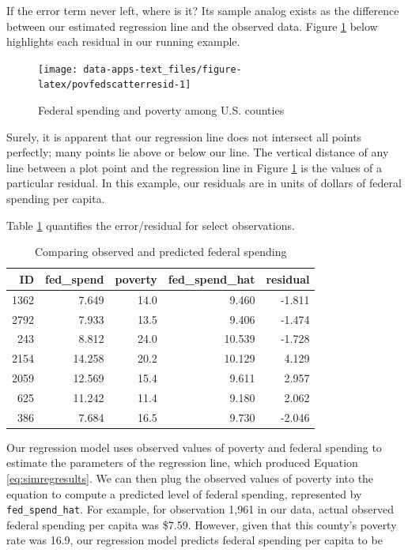 \documentclass[
]{book}
\begin{document}
If the error term never left, where is it? Its sample analog exists as the difference between our estimated regression line and the observed data. Figure \ref{fig:povfedscatterresid} below highlights each residual in our running example.

\begin{figure}

{\centering \texttt{[image: data-apps-text\_files/figure-latex/povfedscatterresid-1]} 

}

\caption{Federal spending and poverty among U.S. counties}\label{fig:povfedscatterresid}
\end{figure}

Surely, it is apparent that our regression line does not intersect all points perfectly; many points lie above or below our line. The vertical distance of any line between a plot point and the regression line in Figure \ref{fig:povfedscatterresid} is the values of a particular residual. In this example, our residuals are in units of dollars of federal spending per capita.

Table \ref{tab:simregexresid} quantifies the error/residual for select observations.

\begin{table}

\caption{\label{tab:simregexresid}Comparing observed and predicted federal spending}
\centering
\begin{tabular}[t]{r|r|r|r|r}
\hline
ID & fed\_spend & poverty & fed\_spend\_hat & residual\\
\hline
1362 & 7.649 & 14.0 & 9.460 & -1.811\\
\hline
2792 & 7.933 & 13.5 & 9.406 & -1.474\\
\hline
243 & 8.812 & 24.0 & 10.539 & -1.728\\
\hline
2154 & 14.258 & 20.2 & 10.129 & 4.129\\
\hline
2059 & 12.569 & 15.4 & 9.611 & 2.957\\
\hline
625 & 11.242 & 11.4 & 9.180 & 2.062\\
\hline
386 & 7.684 & 16.5 & 9.730 & -2.046\\
\hline
\end{tabular}
\end{table}

Our regression model uses observed values of poverty and federal spending to estimate the parameters of the regression line, which produced Equation \eqref{eq:simregresults}. We can then plug the observed values of poverty into the equation to compute a predicted level of federal spending, represented by \texttt{fed\_spend\_hat}. For example, for observation 1,961 in our data, actual observed federal spending per capita was \$7.59. However, given that this county's poverty rate was 16.9, our regression model predicts federal spending per capita to be
\end{document}
